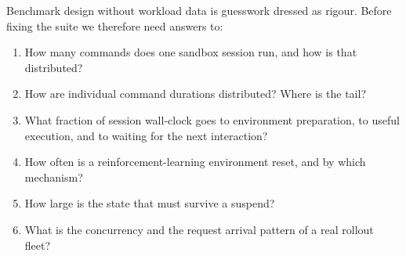 Benchmark design without workload data is guesswork dressed as rigour. Before
fixing the suite we therefore need answers to:

\begin{enumerate}
  \item How many commands does one sandbox session run, and how is that
  distributed?
  \item How are individual command durations distributed? Where is the tail?
  \item What fraction of session wall-clock goes to environment preparation,
  to useful execution, and to waiting for the next interaction?
  \item How often is a reinforcement-learning environment reset, and by which
  mechanism?
  \item How large is the state that must survive a suspend?
  \item What is the concurrency and the request arrival pattern of a real
  rollout fleet?
\end{enumerate}

